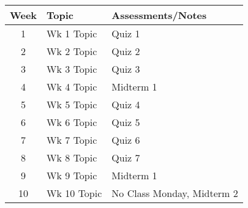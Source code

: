 \documentclass{article}
\begin{document}
\begin{table}[ht]
	\centering
\begin{tabular}{|c|l|l|}
\hline
\textbf{Week} & \textbf{Topic}     & \textbf{Assessments/Notes}               \\ \hline
1              & Wk 1 Topic            & Quiz 1                                                                     \\ \hline
2             & Wk 2 Topic            & Quiz 2                                                                     \\ \hline
3             & Wk 3 Topic            & Quiz 3                                                                     \\ \hline
4             & Wk 4 Topic            & Midterm 1                                                                  \\ \hline
5             & Wk 5 Topic            & Quiz 4                                                                     \\ \hline
6             & Wk 6 Topic            & Quiz 5                                                                     \\ \hline
7             & Wk 7 Topic            & Quiz 6                                                                     \\ \hline
8             & Wk 8 Topic            & Quiz 7                                                 \\ \hline
9             & Wk 9 Topic            & Midterm 1                                           \\ \hline
10           & Wk 10 Topic           & No Class Monday, Midterm 2           \\ \hline
\end{tabular}
\end{table}
\end{document}

